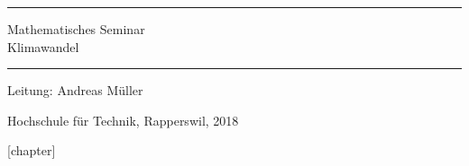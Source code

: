 \documentclass{book}
\begin{document}
\pagestyle{fancy}
\frontmatter
\newcommand\HRule{\noindent\rule{\linewidth}{1.5pt}}
\begin{titlepage}
\HRule
\vspace*{5pt}
\begin{flushright}
{
\LARGE
Mathematisches Seminar\\
\vspace*{20pt}
\Huge
Klimawandel%
}
\vspace*{5pt}
\end{flushright}
\HRule
\begin{flushright}
\vspace{60pt}
\Large
Leitung: Andreas Müller\\
\vspace{40pt}
\Large

\end{flushright}
\begin{center}
Hochschule für Technik, Rapperswil, 2018
\end{center}
\end{titlepage}
\hypersetup{
    linktoc=all,
    linkcolor=blue
}
\newenvironment{beispiele}{
\bgroup\smallskip\parindent0pt\bf Beispiele\egroup

\begin{list}{\arabic{beispiel}.}
  {\usecounter{beispiel}
  \setlength{\labelsep}{5mm}
  \setlength{\rightmargin}{0pt}
}}{\end{list}}
\newenvironment{uebungsaufgaben}{
\begin{list}{\arabic{uebungsaufgabezaehler}.}
  {\usecounter{uebungsaufgabezaehler}
  \setlength{\labelwidth}{2cm}
  \setlength{\leftmargin}{0pt}
  \setlength{\labelsep}{5mm}
  \setlength{\rightmargin}{0pt}
  \setlength{\itemindent}{0pt}
}}{\end{list}\vfill\pagebreak}
\newenvironment{teilaufgaben}{
\begin{enumerate}
\renewcommand{\labelenumi}{\alph{enumi})}
}{\end{enumerate}}
[chapter]
\def\aufgabenpath{chapters/uebungsaufgaben/}
\def\ainput#1{\aufgabenpath/#1}
\def\verbatimainput#1{\expandafter}
\def\aufgabetoplevel#1{%
\expandafter\def\expandafter\inputpath{#1}%
\let\aufgabepath=\inputpath
}
\def\includeagraphics[#1]#2{\expandafter\texttt{[image: \\aufgabepath\#2]}}
\newcommand{\uebungsaufgabe}[1]{%
\refstepcounter{problemcounter}%
\label{#1}%
\bigskip{\parindent0pt\strut}\hbox{\bf\arabic{problemcounter}. }%
\expandafter\def\csname aufgabenpath\endcsname{\inputpath/}%
\expandafter
}
\renewcommand\theproblemcounter{\thechapter.\arabic{problemcounter}}
\newenvironment{linsys}[1]{%
\begin{tabular}{*{#1}{\linsysR@{\;}\linsysC}@{\;}\linsysR}}%
{\end{tabular}}
\end{document}
